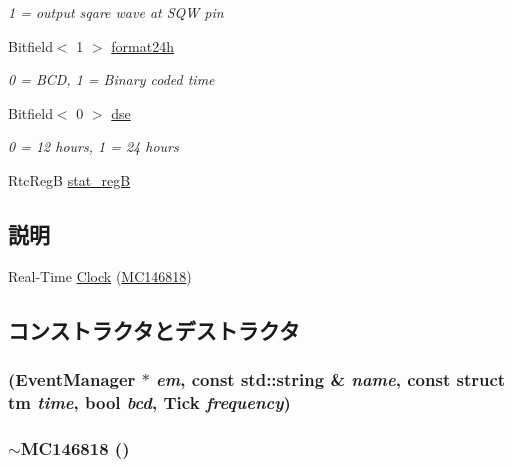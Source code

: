 \begin{DoxyCompactItemize}
\begin{DoxyCompactList}\small\item\em 1 = output sqare wave at SQW pin \item\end{DoxyCompactList}\item 
Bitfield$<$ 1 $>$ \hyperlink{classMC146818_a570b614b6c947c1a65c60a8b5f0c37a6}{format24h}
\begin{DoxyCompactList}\small\item\em 0 = BCD, 1 = Binary coded time \item\end{DoxyCompactList}\item 
Bitfield$<$ 0 $>$ \hyperlink{classMC146818_a08a594a517342cdd7b68781496ff83cb}{dse}
\begin{DoxyCompactList}\small\item\em 0 = 12 hours, 1 = 24 hours \item\end{DoxyCompactList}\item 
RtcRegB \hyperlink{classMC146818_a59e2e13d7510625623f5f3e08ce29b1a}{stat\_\-regB}
\end{DoxyCompactItemize}


\subsection{説明}
Real-\/Time \hyperlink{classClock}{Clock} (\hyperlink{classMC146818}{MC146818}) 

\subsection{コンストラクタとデストラクタ}
\hypertarget{classMC146818_a281b3c32232ad842ca99d76d81907f0d}{
\subsubsection[{MC146818}]{ ({\bf EventManager} $\ast$ {\em em}, \/  const std::string \& {\em name}, \/  const struct tm {\em time}, \/  bool {\em bcd}, \/  {\bf Tick} {\em frequency})}}
\label{classMC146818_a281b3c32232ad842ca99d76d81907f0d}
\hypertarget{classMC146818_a9b8c835ca258cba33b1c311acd73c664}{
\subsubsection[{$\sim$MC146818}]{\setlength{\rightskip}{0pt plus 5cm}$\sim${\bf MC146818} ()}}
\label{classMC146818_a9b8c835ca258cba33b1c311acd73c664}



